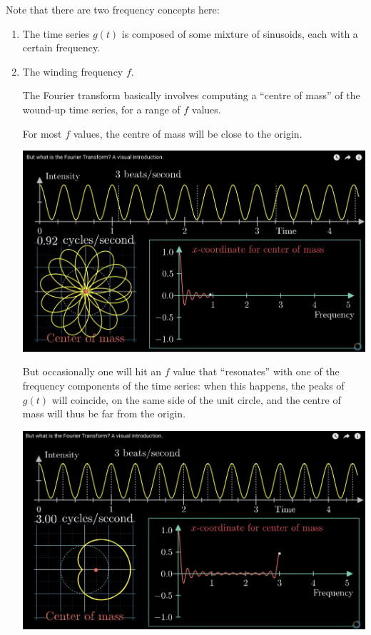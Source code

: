Note that there are two frequency concepts here:
\begin{enumerate}
\item The time series $g(t)$ is composed of some mixture of sinusoids, each with a certain frequency.
\item The winding frequency $f$.

  The Fourier transform basically involves computing a ``centre of mass'' of the wound-up time series, for a
  range of $f$ values.

For most $f$ values, the centre of mass will be close to the origin.
\begin{mdframed}
\includegraphics[width=400pt]{img/fourier--complex-exponentials-review--fourier-transform-eca1.png}
\end{mdframed}

But occasionally one will hit an $f$ value that ``resonates'' with one of the frequency components of the time
series: when this happens, the peaks of $g(t)$ will coincide, on the same side of the unit circle, and the
centre of mass will thus be far from the origin.
\begin{mdframed}
\includegraphics[width=400pt]{img/fourier--complex-exponentials-review--fourier-transform-f265.png}
\end{mdframed}
\end{enumerate}
